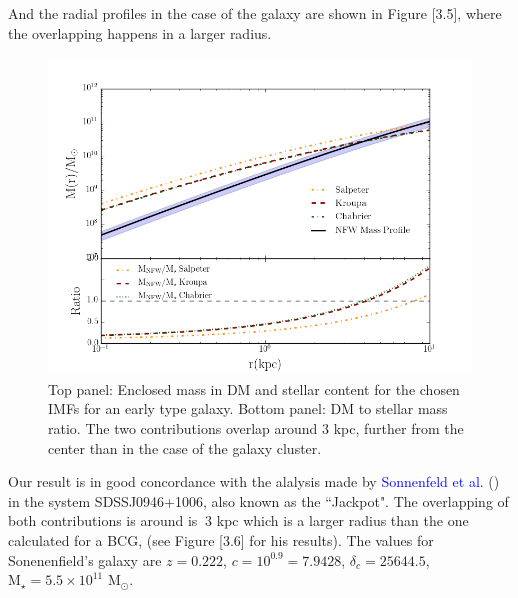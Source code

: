And the radial profiles in the case of the galaxy are shown in Figure [3.5], where the overlapping happens in a larger radius.

\begin{figure}[H]
\centering
\includegraphics[width=12cm]{images/DM_fraction_all_IMFs_galaxy.png}
\caption[DM and Stellar mass profiles for a massive early type galaxy.]{Top panel: Enclosed mass in DM and stellar content for the chosen IMFs for an early type galaxy. Bottom panel: DM to stellar mass ratio. The two contributions overlap around 3 kpc, further from the center than in the case of the galaxy cluster.}
\end{figure}

Our result is in good concordance with the alalysis made by \textcolor{blue}{Sonnenfeld et al.} (\citeyear{Reference15}) in the system SDSSJ0946+1006, also known as the ``Jackpot". The overlapping of both contributions is around is $~3$ kpc which is a larger radius than the one calculated for a BCG, (see Figure [3.6] for his results). The values for Sonenenfield's galaxy are $z=0.222$, $c=10^{0.9}=7.9428$, $\delta_c=25644.5$, $\text{M}_{\star}=5.5\times 10^{11}$ $\text{M}_{\odot}$.

